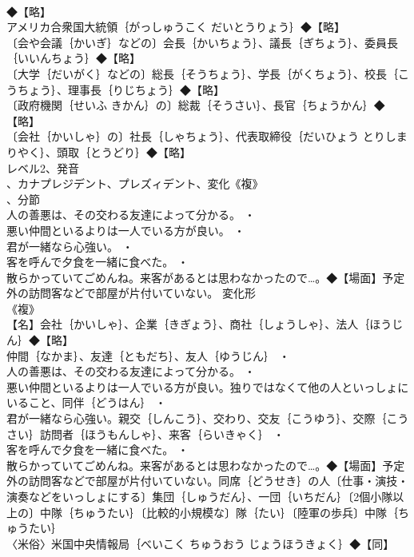 \documentclass[8pt]{extreport}
\begin{document}
\begin{CJK}{UTF8}{min}
\\	◆【略】
\\	アメリカ合衆国大統領｛がっしゅうこく だいとうりょう｝◆【略】
\\	〔会や会議｛かいぎ｝などの〕会長｛かいちょう｝、議長｛ぎちょう｝、委員長｛いいんちょう｝◆【略】
\\	〔大学｛だいがく｝などの〕総長｛そうちょう｝、学長｛がくちょう｝、校長｛こうちょう｝、理事長｛りじちょう｝◆【略】
\\	〔政府機関｛せいふ きかん｝の〕総裁｛そうさい｝、長官｛ちょうかん｝◆【略】
\\	〔会社｛かいしゃ｝の〕社長｛しゃちょう｝、代表取締役｛だいひょう とりしまりやく｝、頭取｛とうどり｝◆【略】
\\	レベル2、発音
\\	、カナプレジデント、プレズィデント、変化《複》
\\	、分節
\\	人の善悪は、その交わる友達によって分かる。 ・
\\	悪い仲間といるよりは一人でいる方が良い。 ・
\\	君が一緒なら心強い。 ・
\\	客を呼んで夕食を一緒に食べた。 ・
\\	散らかっていてごめんね。来客があるとは思わなかったので…。◆【場面】予定外の訪問客などで部屋が片付いていない。	変化形 
\\	《複》
\\	【名】会社｛かいしゃ｝、企業｛きぎょう｝、商社｛しょうしゃ｝、法人｛ほうじん｝◆【略】
\\	仲間｛なかま｝、友達｛ともだち｝、友人｛ゆうじん｝ ・
\\	人の善悪は、その交わる友達によって分かる。 ・
\\	悪い仲間といるよりは一人でいる方が良い。独りではなくて他の人といっしょにいること、同伴｛どうはん｝ ・
\\	君が一緒なら心強い。親交｛しんこう｝、交わり、交友｛こうゆう｝、交際｛こうさい｝訪問者｛ほうもんしゃ｝、来客｛らいきゃく｝ ・
\\	客を呼んで夕食を一緒に食べた。 ・
\\	散らかっていてごめんね。来客があるとは思わなかったので…。◆【場面】予定外の訪問客などで部屋が片付いていない。同席｛どうせき｝の人〔仕事・演技・演奏などをいっしょにする〕集団｛しゅうだん｝、一団｛いちだん｝〔2個小隊以上の〕中隊｛ちゅうたい｝〔比較的小規模な〕隊｛たい｝〔陸軍の歩兵〕中隊｛ちゅうたい｝
\\	〈米俗〉米国中央情報局｛べいこく ちゅうおう じょうほうきょく｝◆【同】

\end{CJK}
\end{document}
